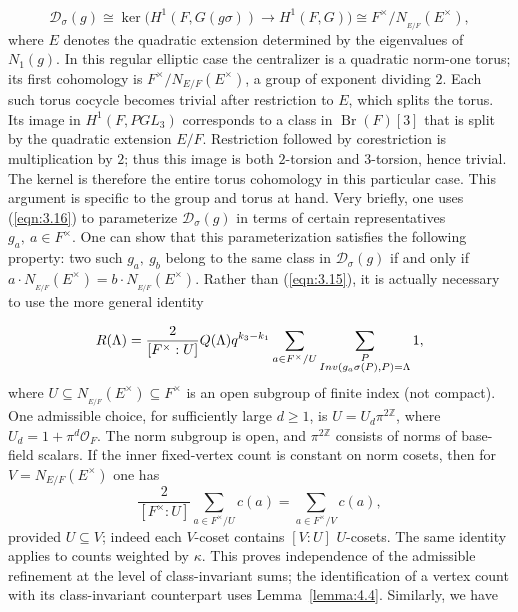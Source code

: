 \documentclass[12pt,letterpaper]{amsart}
\numberwithin{equation}{section}
\theoremstyle{definition}
\theoremstyle{plain}
\providecommand{\cal}{\mathcal}
\def\ddd{{\cal D}}
\begin{document}
\begin{equation}
\label{eqn:3.16}
\ddd_{\sigma}(g) \cong
\ker\bigl(H^1(F,G(g\sigma))\to H^1(F,G)\bigr)
\cong F^{\times}/N_{_{E/F}}(E^{\times}),
\end{equation}
where $E$ denotes the quadratic extension determined
by the eigenvalues of $N_1(g)$. In this regular elliptic case the
centralizer is a quadratic norm-one torus; its first cohomology is
$F^\times/N_{E/F}(E^\times)$, a group of exponent dividing $2$.
Each such torus cocycle becomes trivial after restriction to $E$, which
splits the torus. Its image in $H^1(F,PGL_3)$ corresponds to a class
in $\operatorname{Br}(F)[3]$ that is split by the quadratic extension
$E/F$. Restriction followed by corestriction is multiplication by $2$;
thus this image is both $2$-torsion and $3$-torsion, hence trivial.
The kernel is therefore the entire torus cohomology in this particular
case. This argument is specific to the group and torus at hand. 
Very briefly, one uses (\ref{eqn:3.16}) 
to parameterize $\ddd_{\sigma}(g)$
in terms of certain representatives $g_a,\ a\in F^{\times}$. 
One can
show that this parameterization satisfies the following property:
two such $g_a,\ g_b$ belong to the same class in $\ddd_\sigma (g)$ 
if and only if
$a\cdot N_{_{E/F}}(E^{\times})=b\cdot N_{_{E/F}}(E^{\times})$. 
Rather than (\ref{eqn:3.15}), it is actually 
necessary to use the more general identity

\begin{equation}
\label{eqn:3.17}
R(\Lambda )={2\over{[F^{\times}:U]}}
Q(\Lambda )q^{k_3-k_1}\sum_{a\in F^{\times}/U}
\sum_{\substack{ P\\Inv(g_a\sigma (P),P)=\Lambda}} 1,
\end{equation}
where $U\subseteq N_{_{E/F}}(E^{\times})\subseteq F^{\times}$
is an open subgroup of finite index (not compact). One admissible choice,
for sufficiently large $d\geq1$, is
$U=U_d\pi^{2\mathbb Z}$, where $U_d=1+\pi^d\mathcal O_F$.
The norm subgroup is open, and $\pi^{2\mathbb Z}$ consists of norms
of base-field scalars. If the inner fixed-vertex count is constant on
norm cosets, then for $V=N_{E/F}(E^\times)$ one has
\[
\frac{2}{[F^\times:U]}\sum_{a\in F^\times/U}c(a)
=\sum_{a\in F^\times/V}c(a),
\]
provided $U\subseteq V$; indeed each $V$-coset contains $[V:U]$
$U$-cosets. The same identity applies to counts weighted by $\kappa$.
This proves independence of the admissible refinement at the level of
class-invariant sums; the identification of a vertex count with its
class-invariant counterpart uses Lemma~\ref{lemma:4.4}. Similarly, we have
\end{document}
